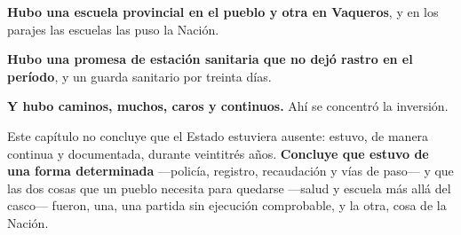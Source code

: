 \textbf{Hubo una escuela provincial en el pueblo y otra en Vaqueros}, y en los parajes las
escuelas las puso la Nación.

\textbf{Hubo una promesa de estación sanitaria que no dejó rastro en el período}, y un guarda
sanitario por treinta días.

\textbf{Y hubo caminos, muchos, caros y continuos.} Ahí se concentró la inversión.

Este capítulo no concluye que el Estado estuviera ausente: estuvo, de manera continua y
documentada, durante veintitrés años. \textbf{Concluye que estuvo de una forma determinada}
---policía, registro, recaudación y vías de paso--- y que las dos cosas que un pueblo necesita
para quedarse ---salud y escuela más allá del casco--- fueron, una, una partida sin ejecución
comprobable, y la otra, cosa de la Nación.

